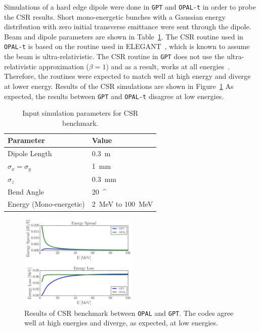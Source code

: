 Simulations of a hard edge dipole were done in \verb|GPT|  
and \verb|OPAL-t| in order to probe the CSR results.
Short mono-energetic bunches with a Gaussian energy distribution with zero initial transverse emittance  
were sent through the dipole.  Beam and dipole parameters are shown in Table~\ref{tab:benchcsr}. 
The CSR routine used in \verb|OPAL-t| is based on the routine used in ELEGANT~\cite{elegant}, 
which is known to assume the beam is ultra-relativistic. The CSR routine in \verb|GPT|  
does not use the ultra-relativistic approximation ($\beta=1$) 
and as a result, works at all energies~\cite{gptcsr}.  
Therefore, the routines were expected to match well at high energy and  
diverge at lower energy. Results of the CSR simulations are shown in Figure~\ref{fig:csr}  
As expected, the results between \verb|GPT| and \verb|OPAL-t| disagree at low energies. 
\begin{table}
	\begin{center}
		\caption{Input simulation parameters for CSR benchmark.}
		\label{tab:benchcsr}
		\begin{tabular}{l l} 
			\toprule
			\toprule
			\textbf{Parameter} & \textbf{Value} \\ 
			\midrule
			Dipole Length & \SI{0.3}{m} \\
			$\sigma_x =\sigma_y$ & \SI{1}{mm} \\
			$\sigma_z$ 			 & \SI{0.3}{mm} \\
			Bend Angle 			 & \SI{20}{^\circ} \\
			Energy (Mono-energetic)	 & \SI{2}{MeV} to \SI{100}{MeV} \\
			\bottomrule			
		\end{tabular}
	\end{center}
\end{table}
\begin{figure}
	\centering
	\includegraphics[width=0.5\textwidth]{./images/CSR}
	\cprotect\caption{Results of CSR benchmark between \verb|OPAL| and \verb|GPT|.
	The codes agree well at high energies and diverge, as expected, at low energies.}
	\label{fig:csr}
\end{figure}

